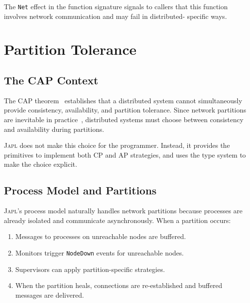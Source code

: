 \documentclass[11pt,a4paper]{article}
\newcommand{\japl}{\textsc{Japl}}
\begin{document}
The \texttt{Net} effect in the function signature signals to callers that
this function involves network communication and may fail in distributed-
specific ways.


\section{Partition Tolerance}
\label{sec:partition}

\subsection{The CAP Context}

The CAP theorem~\citep{brewer2000towards,gilbert2002brewer} establishes
that a distributed system cannot simultaneously provide consistency,
availability, and partition tolerance. Since network partitions are
inevitable in practice~\citep{bailis2014network}, distributed systems must
choose between consistency and availability during partitions.

\japl{} does not make this choice for the programmer. Instead, it provides
the primitives to implement both CP and AP strategies, and uses the type
system to make the choice explicit.

\subsection{Process Model and Partitions}

\japl{}'s process model naturally handles network partitions because
processes are already isolated and communicate asynchronously. When a
partition occurs:

\begin{enumerate}[nosep]
  \item Messages to processes on unreachable nodes are buffered.
  \item Monitors trigger \texttt{NodeDown} events for unreachable nodes.
  \item Supervisors can apply partition-specific strategies.
  \item When the partition heals, connections are re-established and
        buffered messages are delivered.
\end{enumerate}
\end{document}
